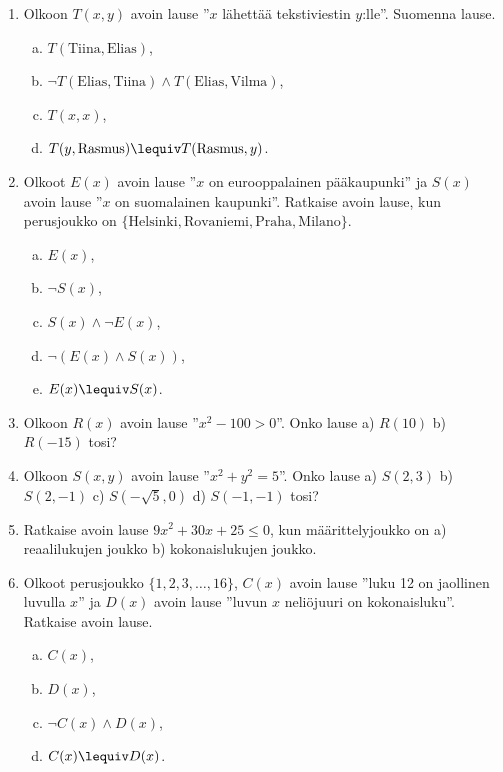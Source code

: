 \begin{enumerate}

\item
Olkoon $T(x, y)$ avoin lause ''$x$ lähettää tekstiviestin
$y$:lle''. Suomenna lause.
\begin{enumerate}[a)]
\item $T(\textrm{Tiina}, \textrm{Elias})$,
\item $\lnot T(\textrm{Elias}, \textrm{Tiina}) \land T(\textrm{Elias}, \textrm{Vilma})$,
\item $T(x, x)$,
\item $T(y, \textrm{Rasmus}) \lequiv T(\textrm{Rasmus}, y)$.
\end{enumerate}

\item
Olkoot $E(x)$ avoin lause ''$x$ on eurooppalainen
pääkaupunki'' ja $S(x)$ avoin lause ''$x$ on suomalainen
kaupunki''. Ratkaise avoin lause, kun perusjoukko on
$\{\textrm{Helsinki}, \textrm{Rovaniemi}, \textrm{Praha}, \textrm{Milano}\}$.
\begin{enumerate}[a)]
\item $E(x)$,
\item $\lnot S(x)$,
\item $S(x) \land \lnot E(x)$,
\item $\lnot (E(x) \land S(x))$,
\item $E(x) \lequiv S(x)$.
\end{enumerate}

\item
Olkoon $R(x)$ avoin lause ''$x^2 - 100 > 0$''. Onko lause
a) $R(10)$ b) $R(-15)$ tosi?

\item
Olkoon $S(x, y)$ avoin lause ''$x^2 + y^2 = 5$''. Onko
lause a) $S(2, 3)$ b) $S(2, -1)$ c) $S(-\sqrt{5}, 0)$ d)
$S(-1, -1)$ tosi?

\item
Ratkaise avoin lause $9x^2 + 30x + 25 \le 0$, kun
määrittelyjoukko on a) reaalilukujen joukko b)
kokonaislukujen joukko.

\item
Olkoot perusjoukko $\{ 1, 2, 3, \ldots , 16\}$, $C(x)$
avoin lause ''luku 12 on jaollinen luvulla $x$'' ja $D(x)$ avoin lause ''luvun $x$ neliöjuuri on kokonaisluku''.
Ratkaise avoin lause.
\begin{enumerate}[a)]
\item $C(x)$,
\item $D(x)$,
\item $\lnot C(x) \land D(x)$,
\item $C(x) \lequiv D(x)$.
\end{enumerate}


\end{enumerate}
